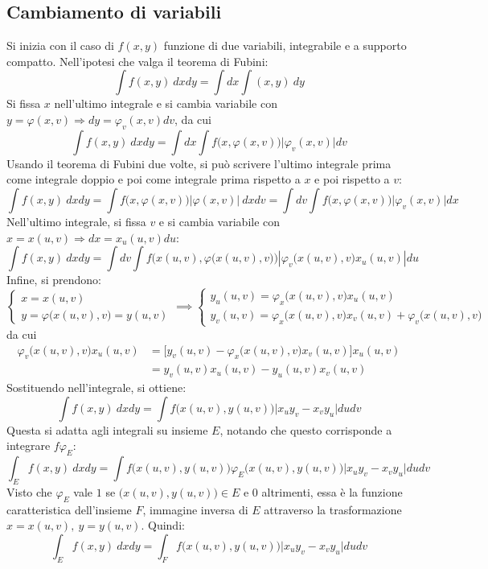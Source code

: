 \documentclass[11pt, a4paper]{scrartcl}
\theoremstyle{definition}
\numberwithin{esempio}{section}
\theoremstyle{definition}
\numberwithin{obs}{section}
\numberwithin{nota}{section}
\numberwithin{equation}{subsection}
\begin{document}
\subsection{Cambiamento di variabili}
Si inizia con il caso di $f(x,y)$ funzione di due variabili, integrabile e a supporto compatto.
Nell'ipotesi che valga il teorema di Fubini:
\[
\int f(x,y) \ dxdy = \int dx \int (x,y) \ dy
\] 
Si fissa $x$ nell'ultimo integrale e si cambia variabile con $y= \varphi (x,v)\Rightarrow dy = \varphi _v (x,v) dv $, da cui
\[
\int f(x,y) \ dxdy = \int dx \int f\big(x,\varphi (x,v)\big)\lvert \varphi _v(x,v) \rvert dv
\] 
Usando il teorema di Fubini due volte, si pu\`o scrivere l'ultimo integrale prima come integrale doppio e poi come integrale prima rispetto a $x$ e poi rispetto a $v$:
\[
\int f(x,y) \ dxdy = \int f\big(x,\varphi (x,v)\big) \lvert \varphi (x,v) \rvert  \ dxdv  = \int dv \int f\big(x,\varphi (x,v)\big)\lvert \varphi _v(x,v) \rvert  dx
\] 
Nell'ultimo integrale, si fissa $v$ e si cambia variabile con $x=x(u,v)\Rightarrow dx = x_u (u,v) du$:
\[
\int f(x,y) \ dxdy = \int dv \int f\Big(x(u,v) , \varphi \big(x(u,v), v\big)\Big) \left\lvert \varphi _v\big(x(u,v) , v\big) x_u(u,v)\right\rvert du
\] 
Infine, si prendono:
\[
\begin{cases}
	x = x(u,v)\\
	y=\varphi \big(x(u,v),v\big)=y(u,v)
\end{cases}\implies \begin{cases}
y_u(u,v) = \varphi _x\big(x(u,v),v\big) x_u(u,v)\\
y_v (u,v) = \varphi _x\big(x(u,v),v\big)x_v(u,v) + \varphi _v \big(x(u,v),v\big)
\end{cases} 
\] 
da cui
\[
	\begin{split}
		\varphi _v\big(x(u,v),v\big)x_u(u,v) &= \big[y_v(u,v) - \varphi_x \big(x(u,v),v\big) x_v(u,v)\big]x_u(u,v)\\
						     &=y_v(u,v) x_u(u,v) - y_u(u,v)x_v(u,v)
	\end{split}
\] 
Sostituendo nell'integrale, si ottiene:
\begin{equation}
	\int f(x,y) \ dxdy = \int f\big(x(u,v),y(u,v)\big) \lvert x_uy_v - x_vy_u \rvert dudv
\end{equation}
Questa si adatta agli integrali su insieme $E$, notando che questo corrisponde a integrare $f \varphi _E$:
\[
	\int_E f(x,y) \ dxdy = \int f\big(x(u,v),y(u,v)\big) \varphi _E \big(x(u,v) , y(u,v)\big)\lvert x_uy_v - x_vy_u \rvert dudv
\] 
Visto che $\varphi _E$ vale $1$ se $\big(x(u,v), y(u,v)\big) \in E$ e $0$ altrimenti, essa \`e la funzione caratteristica dell'insieme $F$, immagine inversa di $E$ attraverso la trasformazione $x=x(u,v) , \ y = y(u,v)$. 
Quindi:
\begin{equation}\label{varcambE}
	\int _E f(x,y) \ dxdy = \int_F f\big(x(u,v),y(u,v)\big) \lvert x_uy_v - x_vy_u \rvert dudv
\end{equation}
\end{document}
